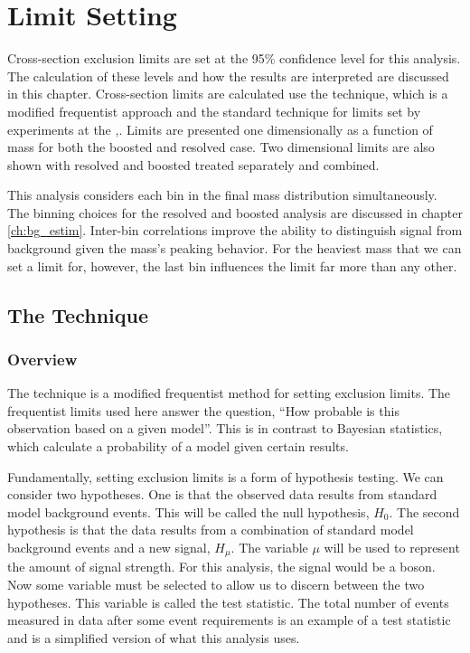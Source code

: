 \chapter{Limit Setting}
Cross-section exclusion limits are set at the 95\% confidence level for this analysis. The calculation of these levels and how the results are interpreted are discussed in this chapter. Cross-section limits are calculated use the \CLs technique, which is a modified frequentist approach and the standard technique for limits set by experiments at the \LHC \cite{CLS2002},\cite{smallStatCLs}. Limits are presented one dimensionally as a function of \WR mass for both the boosted and resolved \NR case. Two dimensional limits are also shown with resolved and boosted treated separately and combined.

This analysis considers each bin in the final \WR mass distribution simultaneously. The binning choices for the resolved and boosted analysis are discussed in chapter \ref{ch:bg_estim}. Inter-bin correlations improve the ability to distinguish signal from background given the \WR mass's peaking behavior. For the heaviest \WR mass that we can set a limit for, however, the last bin influences the limit far more than any other. 
\section{The \CLs Technique}

\subsection{Overview}
The \CLs technique is a modified frequentist method for setting exclusion limits. The frequentist limits used here answer the question, ``How probable is this observation based on a given model''. This is in contrast to Bayesian statistics, which calculate a probability of a model given certain results.

Fundamentally, setting exclusion limits is a form of hypothesis testing. We can consider two hypotheses. One is that the observed data results from standard model background events. This will be called the null hypothesis, $H_{0}$. The second hypothesis is that the data results from a combination of standard model background events and a new signal, $H_{\mu}$. The variable $\mu$ will be used to represent the amount of signal strength. For this analysis, the signal would be a \WR boson. Now some variable must be selected to allow us to discern between the two hypotheses. This variable is called the test statistic. The total number of events measured in data after some event requirements is an example of a test statistic and is a simplified version of what this analysis uses.

